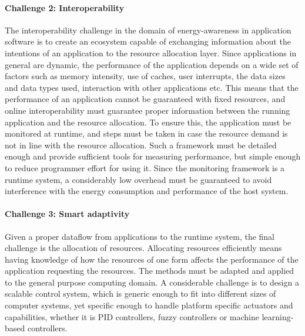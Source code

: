\documentclass{article}
\begin{document}
\paragraph{Challenge 2: Interoperability}
\label{sec:inter}
The interoperability challenge in the domain of energy-awareness in application software is to create an ecosystem capable of exchanging information about the intentions of an application to the resource allocation layer. 
Since applications in general are dynamic, the performance of the application depends on a wide set of factors such as memory intensity, use of caches, user interrupts, the data sizes and data types used, interaction with other applications etc. 
This means that the performance of an application cannot be guaranteed with fixed resources, and online interoperability must guarantee proper information between the running application and the resource allocation.
To ensure this, the application must be monitored at runtime, and steps must be taken in case the resource demand is not in line with the resource allocation.
Such a framework must be detailed enough and provide sufficient tools for measuring performance, but simple enough to reduce programmer effort for using it.
Since the monitoring framework is a runtime system, a considerably low overhead must be guaranteed to avoid interference with the energy consumption and performance of the host system.

\paragraph{Challenge 3: Smart adaptivity}
\label{sec:smart}
Given a proper dataflow from applications to the runtime system, the final challenge is the allocation of resources. 
Allocating resources efficiently means having knowledge of how the resources of one form affects the performance of the application requesting the resources.
The methods must be adapted and applied to the general purpose computing domain. 
A considerable challenge is to design a scalable control system, which is generic enough to fit into different sizes of computer systems, yet specific enough to handle platform specific actuators and capabilities, whether it is PID controllers, fuzzy controllers or machine learning-based controllers.
\end{document}
